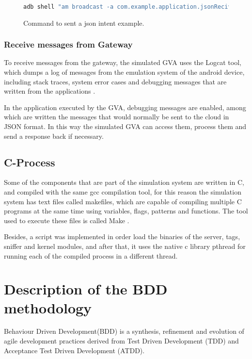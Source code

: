 \documentclass[journal]{IEEEtran}	%
\begin{document}
\begin{figure}[H]
\centering
\begin{lstlisting}[language=bash]
    adb shell "am broadcast -a com.example.application.jsonReciver --es JSON "{ "name": "Robert", "age": 52, "address": "Cra. 35 #15-22", "pets": ["Tasha","Molly","Blast"] }" "
\end{lstlisting}
\caption{Command to sent a json intent example.}
\label{fig:sendIntent}
\end{figure}



\subsubsection{Receive messages from Gateway}
To receive messages from the gateway, the simulated GVA uses the Logcat tool, which dumps a log of messages from the emulation system of the android device, including stack traces, system error cases and debugging messages that are written from the applications \cite{Logcat}.

In the application executed by the GVA, debugging messages are enabled, among which are written the messages that would normally be sent to the cloud in JSON format. In this way the simulated GVA can access them, process them and send a response back if necessary.

\subsection{C-Process}

Some of the components that are part of the simulation system are written in C, and compiled with the same gcc compilation tool, for this reason the simulation system has text files called makefiles, which are capable of compiling multiple C programs at the same time using variables, flags, patterns and functions. The tool used to execute these files is called Make \cite{Make}.

Besides, a script was implemented in order load the binaries of the server, tags, sniffer and kernel modules, and after that, it uses the native c library pthread for running each of the compiled process in a different thread.

\section{Description of the BDD methodology}

Behaviour Driven Development(BDD) is a synthesis, refinement and evolution of agile development practices derived from Test Driven Development (TDD) and Acceptance Test Driven Development (ATDD).
\end{document}
